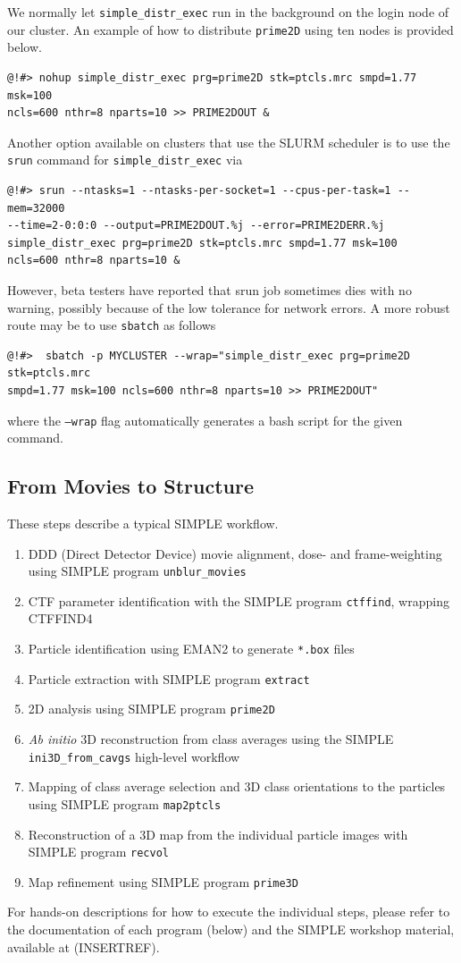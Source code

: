 \documentclass[a4paper,11pt]{article}
\newcommand{\prgname}[1]{\textcolor{NavyBlue}{\texttt{#1}}}
\begin{document}
We normally let \prgname{simple\_distr\_exec} run in the background on the login node of our cluster. An example of how to distribute \prgname{prime2D} using ten nodes is provided below.
\begin{verbatim}
@!#> nohup simple_distr_exec prg=prime2D stk=ptcls.mrc smpd=1.77 msk=100
ncls=600 nthr=8 nparts=10 >> PRIME2DOUT &
\end{verbatim}
Another option available on clusters that use the SLURM scheduler is to use the \texttt{srun} command for \prgname{simple\_distr\_exec} via
\begin{verbatim}
@!#> srun --ntasks=1 --ntasks-per-socket=1 --cpus-per-task=1 --mem=32000 
--time=2-0:0:0 --output=PRIME2DOUT.%j --error=PRIME2DERR.%j
simple_distr_exec prg=prime2D stk=ptcls.mrc smpd=1.77 msk=100
ncls=600 nthr=8 nparts=10 &
\end{verbatim}
However, beta testers have reported that srun job sometimes dies with no warning, possibly because of the low tolerance for network errors. A more robust route may be to use \texttt{sbatch} as follows
\begin{verbatim}
@!#>  sbatch -p MYCLUSTER --wrap="simple_distr_exec prg=prime2D stk=ptcls.mrc 
smpd=1.77 msk=100 ncls=600 nthr=8 nparts=10 >> PRIME2DOUT"
\end{verbatim}
where the \texttt{--wrap} flag automatically generates a bash script for the given command.

\subsection{From Movies to Structure}
These steps describe a typical SIMPLE workflow.
\begin{enumerate}
\item DDD (Direct Detector Device) movie alignment, dose- and frame-weighting using SIMPLE program \prgname{unblur\_movies}
\item CTF parameter identification with the SIMPLE program \prgname{ctffind}, wrapping CTFFIND4 \citep{rohou2015ctffind4}
\item Particle identification using EMAN2 \citep{Tang:2007aa} to generate \texttt{*.box} files
\item Particle extraction with SIMPLE program \prgname{extract}
\item 2D analysis using SIMPLE program \prgname{prime2D}
\item \textit{Ab initio} 3D reconstruction from class averages using the SIMPLE \prgname{ini3D\_from\_cavgs} high-level workflow
\item Mapping of class average selection and 3D class orientations to the particles using SIMPLE program \prgname{map2ptcls}
\item Reconstruction of a 3D map from the individual particle images with SIMPLE program \prgname{recvol}
\item Map refinement using SIMPLE program \prgname{prime3D}
\end{enumerate}
For hands-on descriptions for how to execute the individual steps, please refer to the documentation of each program (below) and the SIMPLE workshop material, available at (INSERTREF).
\end{document}
